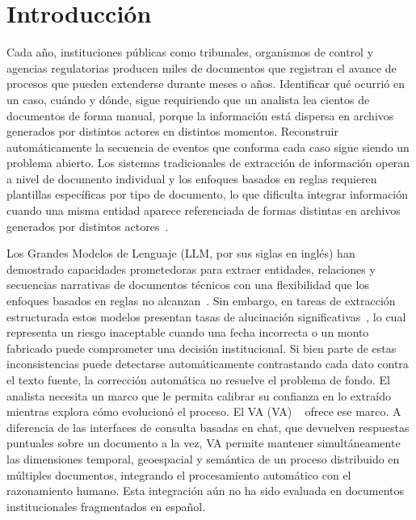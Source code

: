 \chapter{Introducción}
\label{cap:introduccion}

Cada año, instituciones públicas como tribunales, organismos de 
control y agencias regulatorias producen miles de documentos que 
registran el avance de procesos que pueden extenderse durante meses 
o años. Identificar qué ocurrió en un caso, cuándo y dónde, sigue 
requiriendo que un analista lea cientos de documentos de forma 
manual, porque la información está dispersa en archivos generados 
por distintos actores en distintos momentos. Reconstruir 
automáticamente la secuencia de eventos que conforma cada caso 
sigue siendo un problema abierto. Los sistemas tradicionales de 
extracción de información operan a nivel de documento individual y 
los enfoques basados en reglas requieren plantillas específicas por 
tipo de documento, lo que dificulta integrar información cuando una 
misma entidad aparece referenciada de formas distintas en archivos 
generados por distintos actores~\cite{cattan2021crossdoc}.

Los Grandes Modelos de Lenguaje (\acs{LLM}, por sus siglas en inglés)
 han demostrado capacidades 
prometedoras para extraer entidades, relaciones y secuencias 
narrativas de documentos técnicos con una flexibilidad que los 
enfoques basados en reglas no alcanzan~\cite{brown2020, wei2022}. 
Sin embargo, en tareas de extracción estructurada estos modelos 
presentan tasas de alucinación significativas~\cite{ji2023}, lo 
cual representa un riesgo inaceptable cuando una fecha incorrecta 
o un monto fabricado puede comprometer una decisión institucional. 
Si bien parte de estas inconsistencias puede detectarse 
automáticamente contrastando cada dato contra el texto fuente, la 
corrección automática no resuelve el problema de fondo. El analista 
necesita un marco que le permita calibrar su confianza en lo 
extraído mientras explora cómo evolucionó el proceso. El 
\acl{VA} (\acs{VA}) ~\cite{keim2008visual, sacha2014} 
ofrece ese marco. A diferencia de las interfaces de consulta 
basadas en chat, que devuelven respuestas puntuales sobre un 
documento a la vez, %
\ac{VA} permite mantener simultáneamente las 
dimensiones temporal, geoespacial y semántica de un proceso 
distribuido en múltiples documentos, integrando el procesamiento 
automático con el razonamiento humano. Esta integración aún no ha 
sido evaluada en documentos institucionales fragmentados en español.

